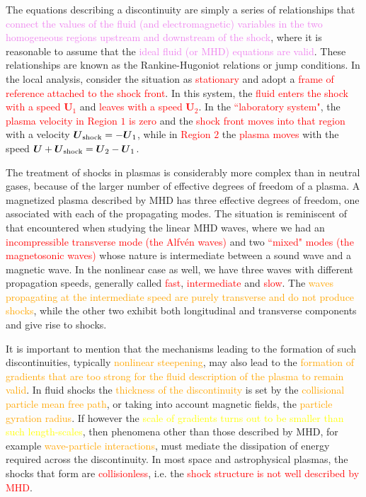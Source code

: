 \documentclass[12pt,a4paper]{article}
\renewcommand{\vec}[1]{\boldsymbol{#1}}
\begin{document}
The equations describing a discontinuity are simply a series of relationships that \textcolor{violet}{connect the values of the fluid (and electromagnetic) variables in the two homogeneous regions upstream and downstream of the shock}, where it is reasonable to assume that the \textcolor{violet}{ideal fluid (or MHD) equations are valid}. These relationships are known as the Rankine-Hugoniot relations or jump conditions. In the local analysis, consider the situation as \textcolor{red}{stationary} and adopt a \textcolor{red}{frame of reference attached to the shock front}. In this system, the \textcolor{red}{fluid enters the shock with a speed $\vec{U}_1$} and \textcolor{red}{leaves with a speed $\vec{U}_2$}. In the \textcolor{red}{``laboratory system"},  the \textcolor{red}{plasma velocity in Region $1$ is zero} and the \textcolor{red}{shock front moves into that region} with a velocity \textcolor{red}{$\vec{U}_{\rm shock} = -\vec{U}_1$}, while in \textcolor{red}{Region $2$} the \textcolor{red}{plasma moves} with the speed \textcolor{red}{$\vec{U} + \vec{U}_{\rm shock} = \vec{U}_2 - \vec{U}_1$}.


The treatment of shocks in plasmas is considerably more complex than in neutral gases, because of the larger number of effective degrees of freedom of a plasma. A magnetized plasma described by MHD has three effective degrees of freedom, one associated with each of the propagating modes. The situation is reminiscent of that encountered when studying the linear MHD waves, where we had an \textcolor{red}{incompressible transverse mode (the Alfv\'en waves)} and two \textcolor{red}{``mixed" modes (the magnetosonic waves)} whose nature is intermediate between a sound wave and a magnetic wave. In the nonlinear case as well, we have three waves with different propagation speeds, generally called \textcolor{red}{fast}, \textcolor{red}{intermediate} and \textcolor{red}{slow}. The \textcolor{orange}{waves propagating at the intermediate speed are purely transverse and do not produce shocks}, while the other two exhibit both longitudinal and transverse components and give rise to shocks.

It is important to mention that the mechanisms leading to the formation of such discontinuities, typically \textcolor{orange}{nonlinear steepening}, may also lead to the \textcolor{orange}{formation of gradients that are too strong for the fluid description of the plasma to remain valid}. In fluid shocks the \textcolor{orange}{thickness of the discontinuity} is set by the \textcolor{orange}{collisional particle mean free path}, or taking into account magnetic fields, the \textcolor{orange}{particle gyration radius}. If however the \textcolor{yellow}{scale of gradients turns out to be smaller than such length-scales}, then phenomena other than those described by MHD, for example \textcolor{orange}{wave-particle interactions}, must mediate the dissipation of energy required across the discontinuity. In most space and astrophysical plasmas, the shocks that form are \textcolor{red}{collisionless}, i.e. the \textcolor{red}{shock structure is not well described by MHD}.
\end{document}
